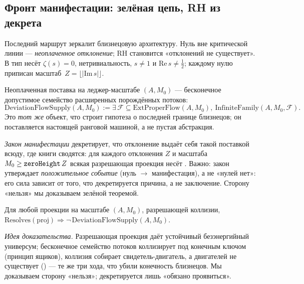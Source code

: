 \subsection{Фронт манифестации: зелёная цепь, RH из декрета}

Последний маршрут зеркалит близнецовую архитектуру. Нуль вне критической линии --- \emph{неоплаченное
отклонение}; RH становится «отклонений не существует». В  тип 
несёт $\zeta(s)=0$, нетривиальность, $s\ne1$ и $\mathrm{Re}\,s\ne\tfrac12$; каждому нулю приписан
масштаб \,$Z = \lfloor|\mathrm{Im}\,s|\rfloor$.

\begin{definition}\label{def:DeviationFlowSupply}
Неоплаченная поставка на леджер-масштабе $(A,M_0)$ --- бесконечное допустимое семейство расширенных
порождённых потоков:
\begin{equation}\label{eq:deviation-supply}
  \mathrm{DeviationFlowSupply}(A,M_0) := \exists\,\mathcal{F}\subseteq\mathrm{ExtProperFlow}(A,M_0),\ \mathrm{InfiniteFamily}(A,M_0,\mathcal{F}) .
\end{equation}
Это \emph{тот же} объект, что строит гипотеза о последней границе близнецов; он поставляется настоящей
ранговой машиной, а не пустая абстракция.
\end{definition}

\emph{Закон манифестации}  декретирует, что отклонение выдаёт себя такой
поставкой всюду, где книги сводятся: для каждого отклонения $Z$ и масштаба
$M_0\ge\texttt{zeroHeight}\,Z$ всякая разрешающая проекция несёт . Важно: закон
утверждает \emph{положительное событие} (нуль $\to$ манифестация), а не «нулей нет»: его сила зависит
от того, что декретируется причина, а не заключение. Сторону «нельзя» мы доказываем зелёной теоремой.

\begin{theorem}\label{thm:no_deviationFlowSupply_at_resolved_scale}
Для любой проекции на масштабе $(A,M_0)$, разрешающей коллизии,
$\mathrm{Resolves}(\mathrm{proj}) \Rightarrow \neg\,\mathrm{DeviationFlowSupply}(A,M_0)$. \green{}
\end{theorem}

\emph{Идея доказательства.} Разрешающая проекция даёт устойчивый безэнергийный универсум; бесконечное
семейство потоков коллизирует под конечным ключом (принцип ящиков), коллизия собирает
свидетель-двигатель, а двигателей не существует () --- те же три
хода, что убили конечность близнецов. Мы доказываем сторону «нельзя»; декретируется лишь «обязано
проявиться».

